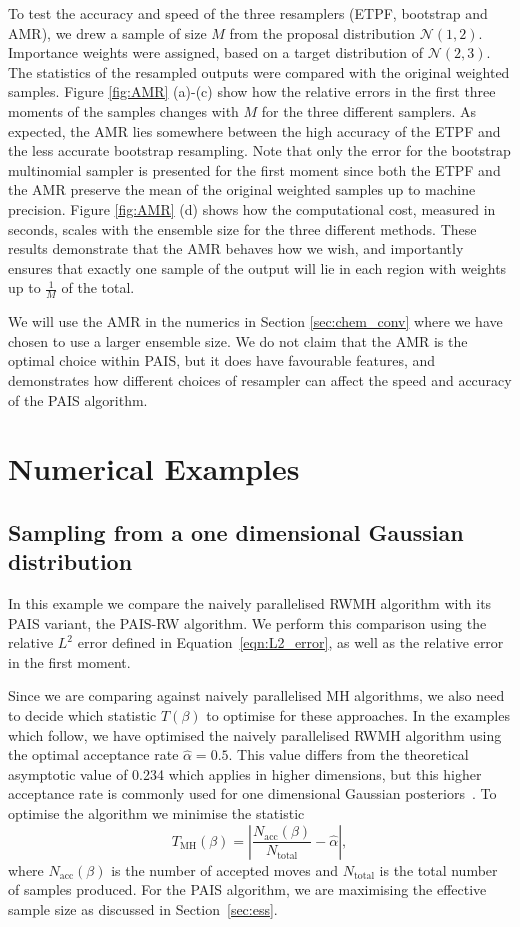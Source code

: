 \documentclass[final]{siamltex}
\begin{document}
To test the accuracy and speed of the three resamplers (ETPF,
bootstrap and AMR), we drew a sample of size $M$ from the proposal distribution
$\mathcal{N}(1,2)$. Importance weights were assigned, based on a
target distribution of $\mathcal{N}(2,3)$. The statistics of the
resampled outputs were compared with the original weighted samples. Figure \ref{fig:AMR} (a)-(c) show how the relative errors in the first
three moments of the samples changes with $M$ for the three different
samplers. As expected, the AMR lies somewhere between the high
accuracy of the ETPF and the less accurate bootstrap
resampling. Note that only the error for the bootstrap multinomial
sampler is presented for the first moment since both the ETPF and the
AMR preserve the mean of the original weighted samples up to machine precision. Figure \ref{fig:AMR} (d) shows how the computational cost,
measured in seconds, scales with the ensemble size for the three
different methods. These results demonstrate that the AMR behaves how we wish, and
importantly ensures that exactly one sample of the output will lie in
each region with weights up to $\frac{1}{M}$ of the total.

We will use the AMR in the numerics in Section \ref{sec:chem_conv}
where we have chosen to use a larger ensemble size. We do not claim
that the AMR is the optimal choice within PAIS, but it does have
favourable features, and demonstrates how different choices of
resampler can affect the speed and accuracy of the PAIS algorithm.

\section{Numerical Examples}\label{Sec:Num}

\subsection{Sampling from a one dimensional Gaussian distribution}\label{sec:problem 1}

In this example we compare the naively parallelised RWMH algorithm with its
PAIS variant, the PAIS-RW algorithm. We perform this comparison using the relative $L^2$ error defined in Equation~\ref{eqn:L2_error}, as well as the relative error in the first moment.


Since we are comparing against naively parallelised MH algorithms,
we also need to decide which statistic $T(\beta)$ to optimise for
these approaches. In the examples which follow, we have optimised the
naively parallelised RWMH algorithm using the optimal acceptance rate
$\hat{\alpha} = 0.5$. This value differs from the theoretical
asymptotic value of 0.234 which applies in higher dimensions, but this higher acceptance rate is commonly used for one dimensional Gaussian posteriors~\cite{rosenthal2011optimal}. To optimise the algorithm we minimise the statistic
\[
	T_{\text{MH}}(\beta) = \left| \frac{N_{\text{acc}}(\beta)}{N_{\text{total}}} - \hat{\alpha} \right|,
\]
where $N_{\text{acc}}(\beta)$ is the number of accepted moves and
$N_{\text{total}}$ is the total number of samples produced. For the
PAIS algorithm, we are maximising the effective sample size as
discussed in Section~\ref{sec:ess}.
\end{document}
